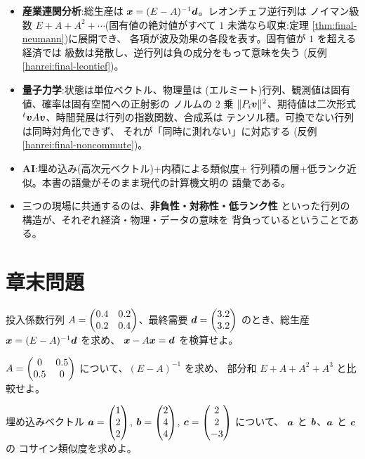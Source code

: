 \begin{matome}
\begin{itemize}
\item \textbf{産業連関分析}:総生産は
$\bm{x} = (E - A)^{-1}\bm{d}$。レオンチェフ逆行列は
ノイマン級数 $E + A + A^2 + \cdots$(固有値の絶対値がすべて
$1$ 未満なら収束:定理 \ref{thm:final-neumann})に展開でき、
各項が波及効果の各段を表す。固有値が $1$ を超える経済では
級数は発散し、逆行列は負の成分をもって意味を失う
(反例 \ref{hanrei:final-leontief})。
\item \textbf{量子力学}:状態は単位ベクトル、物理量は
(エルミート)行列、観測値は固有値、確率は固有空間への正射影の
ノルムの $2$ 乗 $\|P_i\bm{v}\|^2$、期待値は二次形式
${}^t\bm{v}A\bm{v}$、時間発展は行列の指数関数、合成系は
テンソル積。可換でない行列は同時対角化できず、
それが「同時に測れない」に対応する
(反例 \ref{hanrei:final-noncommute})。
\item \textbf{AI}:埋め込み(高次元ベクトル)+内積による類似度+
行列積の層+低ランク近似。本書の語彙がそのまま現代の計算機文明の
語彙である。
\item 三つの現場に共通するのは、\textbf{非負性・対称性・低ランク性}
といった行列の構造が、それぞれ経済・物理・データの意味を
背負っているということである。
\end{itemize}
\end{matome}

\section*{章末問題}

\begin{mondai}[基本]\label{q:final-ex1}
投入係数行列 $A = \begin{pmatrix}0.4 & 0.2 \\ 0.2 & 0.4\end{pmatrix}$、最終需要
$\bm{d} = \begin{pmatrix}3.2 \\ 3.2\end{pmatrix}$ のとき、総生産
$\bm{x} = (E - A)^{-1}\bm{d}$ を求め、
$\bm{x} - A\bm{x} = \bm{d}$ を検算せよ。
\end{mondai}

\begin{mondai}[基本]\label{q:final-ex2}
$A = \begin{pmatrix}0 & 0.5 \\ 0.5 & 0\end{pmatrix}$ について、$(E - A)^{-1}$ を求め、
部分和 $E + A + A^2 + A^3$ と比較せよ。
\end{mondai}

\begin{mondai}[基本]\label{q:final-ex3}
埋め込みベクトル
$\bm{a} = \begin{pmatrix}1 \\ 2 \\ 2\end{pmatrix}$, $\bm{b} = \begin{pmatrix}2 \\ 4 \\ 4\end{pmatrix}$,
$\bm{c} = \begin{pmatrix}2 \\ 2 \\ -3\end{pmatrix}$ について、
$\bm{a}$ と $\bm{b}$、$\bm{a}$ と $\bm{c}$ の
コサイン類似度を求めよ。
\end{mondai}

